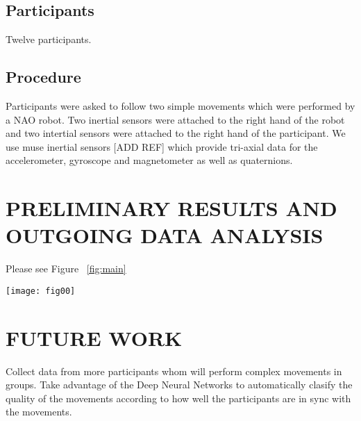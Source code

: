\documentclass{sig-alternate-05-2015}
\begin{document}
\subsection{Participants}
Twelve participants.
\subsection{Procedure}
Participants were asked to follow two simple movements which were performed by a NAO robot.
Two inertial sensors were attached to the right hand of the robot and two intertial sensors were attached
to the right hand of the participant. We use muse inertial sensors [ADD REF]
which provide tri-axial data for the accelerometer, gyroscope and magnetometer as well
as quaternions.



\section{PRELIMINARY RESULTS AND OUTGOING DATA ANALYSIS}



Please see Figure ~\ref{fig:main} 
\begin{figure*}
\centering
\texttt{[image: fig00]}
\caption{Ten repetitions of vertical and  horizontal movement were performed by twelve participants 
following a humanoid robot.
Error bars present the mean values for ACC and GYR sensors for participants and the robot
of which the sensors 01 and 02 were attached to participants
 and the sensors 03 and 04 were attached to the robot. 
(x) Time-series for s01-s04 for less and more sync horizontal movement with respect to the robot.
(z) Time-series for s01-s04 for less and more sync vertical movement with respect to the robot.
}
\label{fig:main}
\end{figure*}






\section{FUTURE WORK}

Collect data from more participants whom will perform complex movements in groups.
Take advantage of the Deep Neural Networks to automatically clasify the quality of the movements 
according to how well the participants are in sync with the movements.
\end{document}
